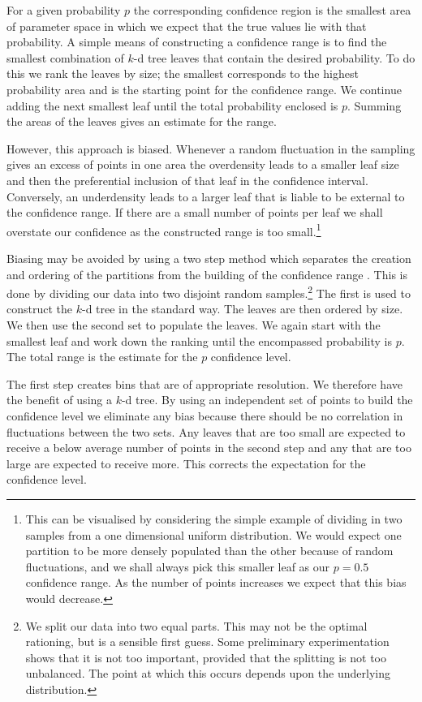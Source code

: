 \documentclass[useAMS,usedcolumn,usegraphicx,usenatbib]{mn2e}
\begin{document}
For a given probability $p$ the corresponding confidence region is the smallest area of parameter space in which we expect that the true values lie with that probability. A simple means of constructing a confidence range is to find the smallest combination of $k$-d tree leaves that contain the desired probability. To do this we rank the leaves by size; the smallest corresponds to the highest probability area and is the starting point for the confidence range. We continue adding the next smallest leaf until the total probability enclosed is $p$. Summing the areas of the leaves gives an estimate for the range.

However, this approach is biased. Whenever a random fluctuation in the sampling gives an excess of points in one area the overdensity leads to a smaller leaf size and then the preferential inclusion of that leaf in the confidence interval. Conversely, an underdensity leads to a larger leaf that is liable to be external to the confidence range. If there are a small number of points per leaf we shall overstate our confidence as the constructed range is too small.\footnote{This can be visualised by considering the simple example of dividing in two samples from a one dimensional uniform distribution. We would expect one partition to be more densely populated than the other because of random fluctuations, and we shall always pick this smaller leaf as our $p = 0.5$ confidence range. As the number of points increases we expect that this bias would decrease.}

Biasing may be avoided by using a two step method which separates the creation and ordering of the partitions from the building of the confidence range \citep*{Sidery2013}. This is done by dividing our data into two disjoint random samples.\footnote{We split our data into two equal parts. This may not be the optimal rationing, but is a sensible first guess. Some preliminary experimentation shows that it is not too important, provided that the splitting is not too unbalanced. The point at which this occurs depends upon the underlying distribution.} The first is used to construct the $k$-d tree in the standard way. The leaves are then ordered by size. We then use the second set to populate the leaves. We again start with the smallest leaf and work down the ranking until the encompassed probability is $p$. The total range is the estimate for the $p$ confidence level.

The first step creates bins that are of appropriate resolution. We therefore have the benefit of using a $k$-d tree. By using an independent set of points to build the confidence level we eliminate any bias because there should be no correlation in fluctuations between the two sets. Any leaves that are too small are expected to receive a below average number of points in the second step and any that are too large are expected to receive more. This corrects the expectation for the confidence level.
\end{document}
